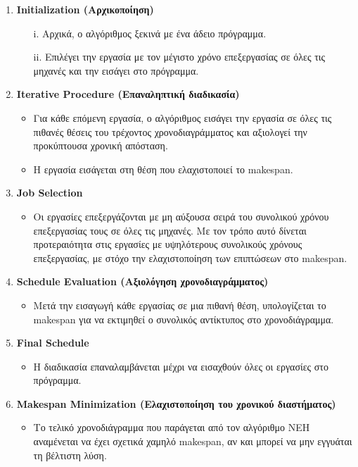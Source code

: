 \documentclass[paper=a4, fontsize=11pt]{scrartcl}
\numberwithin{equation}{section}		%
\numberwithin{figure}{section}			%
\numberwithin{table}{section}				%
\begin{document}
\begin{enumerate}
   \item \textbf{Initialization (Αρχικοποίηση)}
   \begin{itemize}
     \item[i.] Αρχικά, ο αλγόριθμος ξεκινά με ένα άδειο πρόγραμμα.
     \item[ii.] Επιλέγει την εργασία με τον μέγιστο χρόνο επεξεργασίας σε όλες τις μηχανές και την εισάγει στο πρόγραμμα.
   \end{itemize}
   \item \textbf{Iterative Procedure (Επαναληπτική διαδικασία)}
   \begin{itemize}
     \item Για κάθε επόμενη εργασία, ο αλγόριθμος εισάγει την εργασία σε όλες τις πιθανές θέσεις του τρέχοντος χρονοδιαγράμματος και αξιολογεί την προκύπτουσα χρονική απόσταση.
     \item Η εργασία εισάγεται στη θέση που ελαχιστοποιεί το makespan.
   \end{itemize}
   \item \textbf{Job Selection}
   \begin{itemize}
     \item Οι εργασίες επεξεργάζονται με μη αύξουσα σειρά του συνολικού χρόνου επεξεργασίας τους σε όλες τις μηχανές. Με τον τρόπο αυτό δίνεται προτεραιότητα στις εργασίες με υψηλότερους συνολικούς χρόνους επεξεργασίας, με στόχο την ελαχιστοποίηση των επιπτώσεων στο makespan.
   \end{itemize}
   \item \textbf{Schedule Evaluation (Αξιολόγηση χρονοδιαγράμματος)}
   \begin{itemize}
     \item Μετά την εισαγωγή κάθε εργασίας σε μια πιθανή θέση, υπολογίζεται το makespan για να εκτιμηθεί ο συνολικός αντίκτυπος στο χρονοδιάγραμμα.
   \end{itemize}
   \item \textbf{Final Schedule}
   \begin{itemize}
     \item Η διαδικασία επαναλαμβάνεται μέχρι να εισαχθούν όλες οι εργασίες στο πρόγραμμα.
   \end{itemize}
   \item \textbf{Makespan Minimization (Ελαχιστοποίηση του χρονικού διαστήματος)}
   \begin{itemize}
     \item Το τελικό χρονοδιάγραμμα που παράγεται από τον αλγόριθμο NEH αναμένεται να έχει σχετικά χαμηλό makespan, αν και μπορεί να μην εγγυάται τη βέλτιστη λύση.
   \end{itemize}
\end{enumerate}
\end{document}
